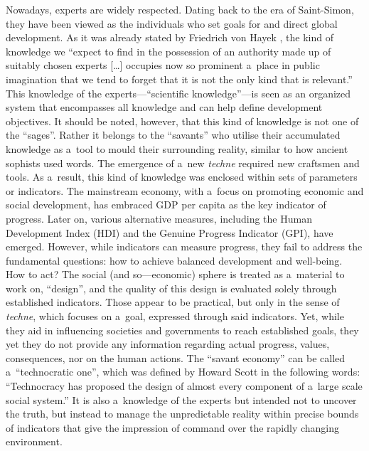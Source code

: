 Nowadays, experts are widely respected. Dating back to the era of Saint-Simon, they have been viewed as the individuals who set goals for and direct global development. As it was already stated by Friedrich von Hayek 
\parencite*[][p.521]{hayek_use_1945}, %
 the kind of knowledge we ``expect to find in the possession of an authority made up of suitably chosen experts […] occupies now so prominent a~place in public imagination that we tend to forget that it is not the only kind that is relevant.'' This knowledge of the experts---``scientific knowledge''---is seen as an organized system that encompasses all knowledge and can help define development objectives. It should be noted, however, that this kind of knowledge is not one of the ``sages''. Rather it belongs to the ``savants'' who utilise their accumulated knowledge as a~tool to mould their surrounding reality, similar to how ancient sophists used words. The emergence of a~new \textit{techne} required new craftsmen and tools. As a~result, this kind of knowledge was enclosed within sets of parameters or indicators. The mainstream economy, with a~focus on promoting economic and social development, has embraced GDP per capita as the key indicator of progress. Later on, various alternative measures, including the Human Development Index (HDI) and the Genuine Progress Indicator (GPI), have emerged. However, while indicators can measure progress, they fail to address the fundamental questions: how to achieve balanced development and well-being. How to act? The social (and so---economic) sphere is treated as a~material to work on, ``design'', and the quality of this design is evaluated solely through established indicators. Those appear to be practical, but only in the sense of \textit{techne}, which focuses on a~goal, expressed through said indicators. Yet, while they aid in influencing societies and governments to reach established goals, they yet they do not provide any information regarding actual progress, values, consequences, nor on the human actions. The ``savant economy'' can be called a~``technocratic one'', which was defined by Howard Scott 
\parencite*[][p.10]{scott_history_1965} %
 in the following words: ``Technocracy has proposed the design of almost every component of a~large scale social system.'' It is also a~knowledge of the experts but intended not to uncover the truth, but instead to manage the unpredictable reality within precise bounds of indicators that give the impression of command over the rapidly changing environment.



